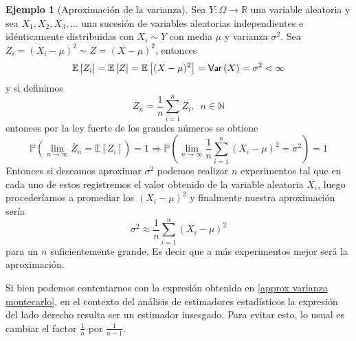 \documentclass[11pt,a4paper]{book}
\theoremstyle{definition}%
\newtheorem{ejemplo}[teorema]{Ejemplo}
\newcommand{\Natural}{\mathbb{N}}
\newcommand{\EV}[1]{\mathbb{E}\left[#1\right]}
\newcommand{\Prob}[1]{\mathds{P}\left( #1 \right)}
\newcommand{\Var}[1]{\textup{\textsf{Var}}\left(#1\right)}
\begin{document}
            \begin{ejemplo}[Aproximación de la varianza]\label{montecarlo varianza}
                Sea $Y:\Omega\longrightarrow\mathbb{R}$ una variable aleatoria y sea $X_1,X_2,X_3,\ldots$ una sucesión de variables aleatorias independientes e idénticamente distribuidas con $X_i \sim Y$ con media $\mu$ y varianza $\sigma^2$. Sea $Z_i=(X_i-\mu)^2\sim Z=(X-\mu)^2$, entonces
                \begin{equation*}
                    \EV{Z_i}=\EV{Z}=\EV{(X-\mu)^2}=\Var{X}=\sigma^2<\infty
                \end{equation*}
                y si definimos
                \begin{equation*}
                    \overline{Z}_n = \frac{1}{n}\sum_{i=1}^n Z_i,\enspace n \in\Natural
                \end{equation*}
                entonces por la ley fuerte de los grandes números se obtiene
                \begin{equation*}
                    \Prob{ \lim_{n \to \infty} \overline{Z}_{n} = \EV{Z_i}}= 1 \Longrightarrow \Prob{ \lim_{n \to \infty} \frac{1}{n}\sum_{i=1}^n (X_i-\mu)^2 = \sigma^2}= 1
                \end{equation*}
                Entonces si deseamos aproximar $\sigma^2$ podemos realizar $n$ experimentos tal que en cada uno de estos registremos el valor obtenido de la variable aleatoria $X_i$, luego procederíamos a promediar los $(X_i-\mu)^2$ y finalmente nuestra aproximación sería 
                \begin{equation}\label{approx varianza montecarlo}
                    \sigma^2 \approx \frac{1}{n}\sum_{i=1}^n (X_i-\mu)^2
                \end{equation}
                para un $n$ suficientemente grande. Es decir que a más experimentos mejor será la aproximación.
            \end{ejemplo}

            Si bien podemos contentarnos con la expresión obtenida en \ref{approx varianza montecarlo}, en el contexto del análisis de estimadores estadísticos la expresión del lado derecho resulta ser un estimador insesgado. Para evitar esto, lo usual es cambiar el factor $\frac{1}{n}$ por $\frac{1}{n-1}$.
\end{document}
